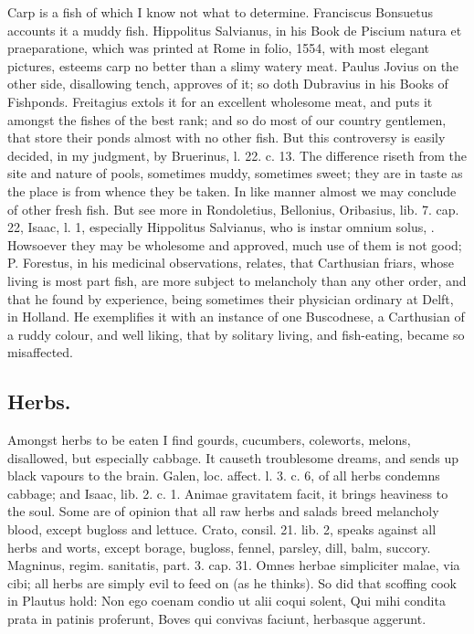 {{Carp is a fish of which I know not what to determine. Franciscus
Bonsuetus accounts it a muddy fish. Hippolitus Salvianus, in his Book
de Piscium natura et praeparatione, which was printed at Rome in folio,
1554, with most elegant pictures, esteems carp no better than a slimy
watery meat. Paulus Jovius on the other side, disallowing tench,
approves of it; so doth Dubravius in his Books of Fishponds. Freitagius
extols it for an excellent wholesome meat, and puts it amongst
the fishes of the best rank; and so do most of our country gentlemen,
that store their ponds almost with no other fish. But this controversy
is easily decided, in my judgment, by Bruerinus, l. 22. c. 13. The
difference riseth from the site and nature of pools, sometimes
muddy, sometimes sweet; they are in taste as the place is from whence
they be taken. In like manner almost we may conclude of other fresh
fish. But see more in Rondoletius, Bellonius, Oribasius, lib. 7. cap.
22, Isaac, l. 1, especially Hippolitus Salvianus, who is instar omnium
solus, \etc{}. Howsoever they may be wholesome and approved, much use of
them is not good; P. Forestus, in his medicinal observations,
relates, that Carthusian friars, whose living is most part fish,
are more subject to melancholy than any other order, and that he found
by experience, being sometimes their physician ordinary at Delft, in
Holland. He exemplifies it with an instance of one Buscodnese, a
Carthusian of a ruddy colour, and well liking, that by solitary living,
and fish-eating, became so misaffected.

\subsection{Herbs.}
Amongst herbs to be eaten I find gourds, cucumbers,
coleworts, melons, disallowed, but especially cabbage. It causeth
troublesome dreams, and sends up black vapours to the brain. Galen,
loc. affect. l. 3. c. 6, of all herbs condemns cabbage; and Isaac, lib.
2. c. 1. Animae gravitatem facit, it brings heaviness to the soul. Some
are of opinion that all raw herbs and salads breed melancholy blood,
except bugloss and lettuce. Crato, consil. 21. lib. 2, speaks against
all herbs and worts, except borage, bugloss, fennel, parsley, dill,
balm, succory. Magninus, regim. sanitatis, part. 3. cap. 31. Omnes
herbae simpliciter malae, via cibi; all herbs are simply evil to feed
on (as he thinks). So did that scoffing cook in Plautus hold:
Non ego coenam condio ut alii coqui solent,
Qui mihi condita prata in patinis proferunt,
Boves qui convivas faciunt, herbasque aggerunt.


}}
